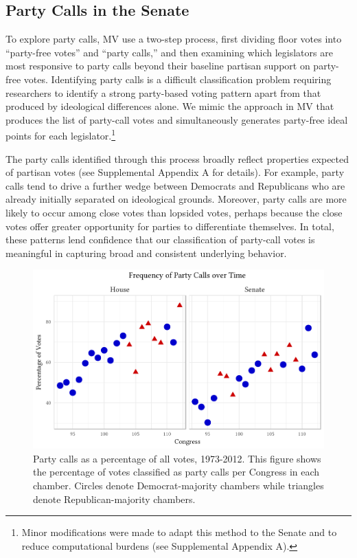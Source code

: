 \documentclass[12pt]{article}
\begin{document}
\subsection*{Party Calls in the Senate}

To explore party calls, MV use a two-step process, first dividing floor votes into ``party-free votes'' and ``party calls,'' and then examining which legislators are most responsive to party calls beyond their baseline partisan support on party-free votes.  Identifying party calls is a difficult classification problem requiring researchers to identify a strong party-based voting pattern apart from that produced by ideological differences alone.  We mimic the approach in MV that produces the list of party-call votes and simultaneously generates party-free ideal points for each legislator.\footnote{\doublespacing\normalsize Minor modifications were made to adapt this method to the Senate and to reduce computational burdens (see Supplemental Appendix A).}

The party calls identified through this process broadly reflect properties expected of partisan votes (see Supplemental Appendix A for details).  For example, party calls tend to drive a further wedge between Democrats and Republicans who are already initially separated on ideological grounds.  Moreover, party calls are more likely to occur among close votes than lopsided votes, perhaps because the close votes offer greater opportunity for parties to differentiate themselves.  In total, these patterns lend confidence that our classification of party-call votes is meaningful in capturing broad and consistent underlying behavior.

\begin{figure}[t]
\centering
\includegraphics{party-calls-over-time.pdf}
\caption{Party calls as a percentage of all votes, 1973-2012.
This figure shows the percentage of votes classified as party calls per Congress in each chamber. Circles denote Democrat-majority chambers while triangles denote Republican-majority chambers.
\label{fig-party-calls-over-time}}
\end{figure}
\end{document}
